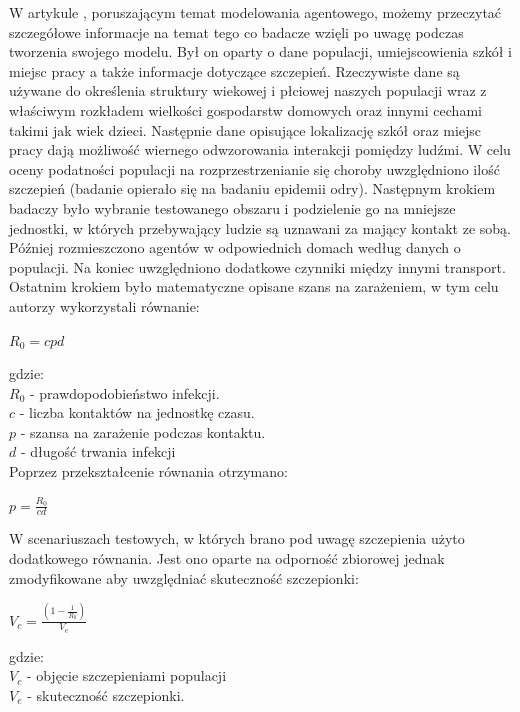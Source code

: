 W artykule \cite{bib:artykul1}, poruszającym temat modelowania agentowego, możemy przeczytać szczegółowe informacje na temat tego co badacze wzięli po uwagę podczas tworzenia swojego modelu.
Był on oparty o dane populacji, umiejscowienia szkół i miejsc pracy a także informacje dotyczące szczepień. Rzeczywiste dane są używane do określenia struktury wiekowej i płciowej naszych populacji wraz z właściwym rozkładem wielkości gospodarstw domowych oraz innymi cechami takimi jak wiek dzieci. Następnie dane opisujące lokalizację szkół oraz miejsc pracy dają możliwość wiernego odwzorowania interakcji pomiędzy ludźmi. W celu oceny podatności populacji na rozprzestrzenianie się choroby uwzględniono ilość szczepień (badanie opierało się na badaniu epidemii odry).
Następnym krokiem badaczy było wybranie testowanego obszaru i podzielenie go na mniejsze jednostki, w których przebywający ludzie są uznawani za mający kontakt ze sobą. Później rozmieszczono agentów w odpowiednich domach według danych o populacji. Na koniec uwzględniono dodatkowe czynniki między innymi transport. 
Ostatnim krokiem było matematyczne opisane szans na zarażeniem, w tym celu autorzy wykorzystali równanie:

\begin{center}
$R_0 = cpd$
\end{center}

gdzie:\\
$R_0$ - prawdopodobieństwo infekcji. \\
$c$ - liczba kontaktów na jednostkę czasu. \\
$p$ - szansa na zarażenie podczas kontaktu. \\
$d$ - długość trwania infekcji \\

Poprzez przekształcenie równania otrzymano: 
\begin{center}
$ p = \frac{R_0}{cd} $
\end{center}

W scenariuszach testowych, w których brano pod uwagę szczepienia użyto dodatkowego równania. Jest ono oparte na odporność zbiorowej jednak zmodyfikowane aby uwzględniać skuteczność szczepionki:

\begin{center}
	$V_c = \frac{(1-\frac{1}{R_0})}{V_e}$
\end{center}

gdzie:\\
$V_c$ - objęcie szczepieniami populacji \\
$V_e$ - skuteczność szczepionki. \\

